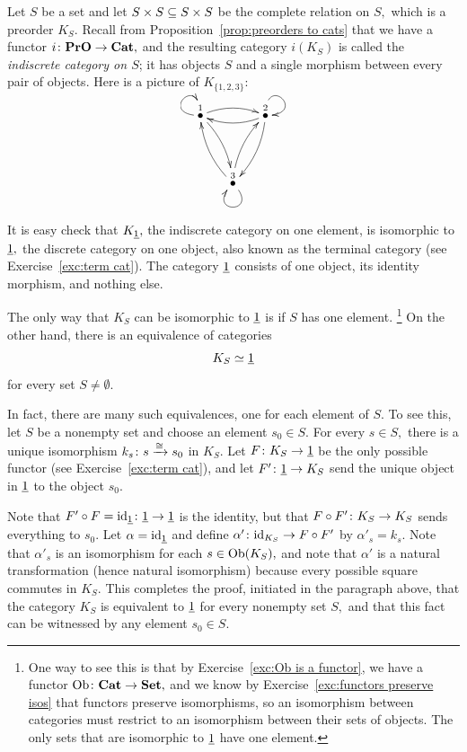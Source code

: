 \documentclass[CT4S-EN-RU]{subfiles}
\begin{document}
\begin{exerciseRUS}
\end{exerciseRUS}

\begin{exampleENG}\label{ex:indiscrete cat equiv to terminal}
Let $S$ be a set and let $S\times S\ss S\times S$ be the complete relation on $S,$ which is a preorder $K_S.$ Recall from Proposition~\ref{prop:preorders to cats} that we have a functor $i\taking\PrO\to\Cat,$ and the resulting category $i(K_S)$ is called the {\em indiscrete category on $S$}; it has objects $S$ and a single morphism between every pair of objects. Here is a picture of $K_{\{1,2,3\}}$:
$$\xymatrix@=15pt{\LMO{1}\ar@(l,u)[]\ar@/^.5pc/[rr]\ar@/^.5pc/[rdd]&&\LMO{2}\ar@(u,r)[]\ar@/^.5pc/[ll]\ar@/^.5pc/[ldd]\\\\&\LMO{3}\ar@(dr,dl)[]_~\ar@/^.5pc/[uur]\ar@/^.5pc/[uul]}$$

It is easy check that $K_{\ul{1}},$ the indiscrete category on one element, is isomorphic to $\ul{1},$ the discrete category on one object, also known as the terminal category (see Exercise~\ref{exc:term cat}). The category $\ul{1}$ consists of one object, its identity morphism, and nothing else. 

The only way that $K_S$ can be isomorphic to $\ul{1}$ is if $S$ has one element.
\footnote{One way to see this is that by Exercise~\ref{exc:Ob is a functor}, we have a functor $\Ob\taking\Cat\to\Set,$ and we know by Exercise~\ref{exc:functors preserve isos} that functors preserve isomorphisms, so an isomorphism between categories must restrict to an isomorphism between their sets of objects. The only sets that are isomorphic to $\ul{1}$ have one element.} 
On the other hand, there is an equivalence of categories $$K_S\simeq\ul{1}$$ for every set $S\neq\emptyset.$ 

In fact, there are many such equivalences, one for each element of $S.$ To see this, let $S$ be a nonempty set and choose an element $s_0\in S.$ For every $s\in S,$ there is a unique isomorphism $k_s\taking s\To{\iso}s_0$ in $K_S.$ Let $F\taking K_S\to\ul{1}$ be the only possible functor (see Exercise~\ref{exc:term cat}), and let $F'\taking\ul{1}\to K_S$ send the unique object in $\ul{1}$ to the object $s_0.$ 

Note that $F'\circ F=\id_{\ul{1}}\taking\ul{1}\to\ul{1}$ is the identity, but that $F\circ F'\taking K_S\to K_S$ sends everything to $s_0.$ Let $\alpha=\id_{\ul{1}}$ and define $\alpha'\taking\id_{K_S}\to F\circ F'$ by $\alpha'_s=k_s.$ Note that $\alpha'_s$ is an isomorphism for each $s\in\Ob(K_S),$ and note that $\alpha'$ is a natural transformation (hence natural isomorphism) because every possible square commutes in $K_S.$ This completes the proof, initiated in the paragraph above, that the category $K_S$ is equivalent to $\ul{1}$ for every nonempty set $S,$ and that this fact can be witnessed by any element $s_0\in S.$
\end{exampleENG}
\end{document}
